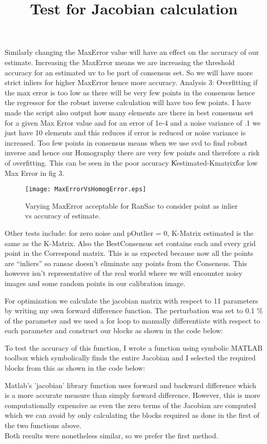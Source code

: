 \documentclass[titlepage]{article}
\begin{document}
Similarly changing the MaxError value will have an effect on the accuracy of our estimate. Increasing the MaxError means we are increasing the threshold accuracy for an estimated uv to be part of consensus set. So we will have more strict inliers for higher MaxError hence more accuracy.
Analysis 3: Overfitting if the max error is too low as there will be very few points in the consensus hence the regressor for the robust inverse calculation will have too few points.
I have made the script also output how many elements are there in best consensus set for a given Max Error value and for an error of 1e-4 and a noise variance of .1 we just have 10 elements and this reduces if error is reduced or noise variance is increased. Too few points in consensus means when we use svd to find robust inverse and hence our Homography there are very few points and therefore a risk of overfitting. This can be seen in the poor accuracy \|\|Kestimated-Kmatrix\|\| for low Max Error in fig 3.
\begin{wrapfigure}{r}{5.5cm}
\caption{Varying MaxError acceptable for RanSac to consider point as inlier vs accuracy of estimate.}\label{wrap-fig:1}
\texttt{[image: MaxErrorVsHomogError.eps]}
\end{wrapfigure} 
Other tests include: for zero noise and pOutlier = 0, K-Matrix estimated is the same as the K-Matrix. Also the BestConsensus set contains each and every grid point in the Correspond matrix. This is as expected because now all the points are “inliers” so ransac doesn't eliminate any points from the Consensus. This however isn't representative of the real world where we will encounter noisy images and some random points in our calibration image.\\
\title{Test for Jacobian calculation} 
 For optimization we calculate the jacobian matrix with respect to 11 parameters by writing my own forward difference function. The perturbation was set to 0.1 \% of the parameter and we used a for loop to manually differentiate with respect to each parameter and construct our blocks as shown in the code below:


 To test the accuracy of this function, I wrote a function using symbolic MATLAB toolbox which symbolically finds the entire Jacobian and I selected the required blocks from this as shown in the code below:

Matlab's 'jacobian' library function uses forward and backward difference which is a more accurate measure than simply forward difference. However, this is more computationally expensive as even the zero terms of the Jacobian are computed which we can avoid by only calculating the blocks required as done in the first of the two functions above.\\
Both results were nonetheless similar, so we prefer the first method.
\end{document}
